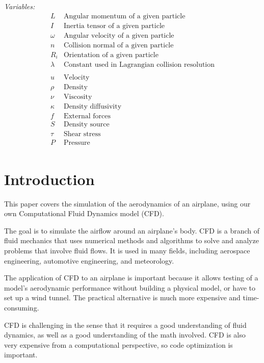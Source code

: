 \documentclass[a4paper,12pt,titlepage]{article}
\begin{document}
\textit{Variables:}
\[
	\begin{array}{ll}
		L & \text{Angular momentum of a given particle} \\
		I & \text{Inertia tensor of a given particle} \\
		\omega & \text{Angular velocity of a given particle} \\
		n & \text{Collision normal of a given particle} \\
		R_i & \text{Orientation of a given particle} \\
		\lambda & \text{Constant used in Lagrangian collision resolution} \\

		\\

		u & \text{Velocity} \\
		\rho & \text{Density} \\
		\nu & \text{Viscosity} \\
		\kappa & \text{Density diffusivity} \\
		f & \text{External forces} \\
		S & \text{Density source}

		\\
		
		\tau & \text{Shear stress} \\
		P & \text{Pressure} \\
	\end{array}
\]
\pagebreak

\section{Introduction}
This paper covers the simulation of the aerodynamics of an airplane, using
our own Computational Fluid Dynamics model (CFD).

The goal is to simulate the airflow around an airplane's body. CFD is a
branch of fluid mechanics that uses numerical methods and algorithms to solve
and analyze problems that involve fluid flows. It is used in many fields,
including aerospace engineering, automotive engineering, and meteorology.

The application of CFD to an airplane is important because it allows testing
of a model's aerodynamic performance without building a physical model, or
have to set up a wind tunnel. The practical alternative is much more expensive
and time-consuming.

CFD is challenging in the sense that it requires a good understanding of fluid
dynamics, as well as a good understanding of the math involved. CFD is also
very expensive from a computational perspective, so code optimization is important.
\end{document}
